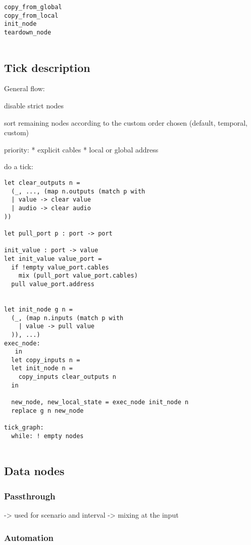 \documentclass[applsci,article,submit,moreauthors,pdftex,10pt,a4paper]{mdpi}
\begin{document}
\begin{lstlisting}
copy_from_global
copy_from_local
init_node
teardown_node


\end{lstlisting} 


\subsection{Tick description}

General flow: 

disable strict nodes

sort remaining nodes according to the custom order chosen (default, temporal, custom)

priority: 
* explicit cables
* local or global address

do a tick: 

\begin{lstlisting}
let clear_outputs n = 
  (_, ..., (map n.outputs (match p with 
  | value -> clear value
  | audio -> clear audio
))

let pull_port p : port -> port 

init_value : port -> value
let init_value value_port = 
  if !empty value_port.cables
    mix (pull_port value_port.cables)
  pull value_port.address


let init_node g n = 
  (_, (map n.inputs (match p with 
    | value -> pull value
  )), ...) 
exec_node: 
   in
  let copy_inputs n = 
  let init_node n = 
    copy_inputs clear_outputs n      
  in 
  
  new_node, new_local_state = exec_node init_node n
  replace g n new_node 
    
tick_graph: 
  while: ! empty nodes 
  
\end{lstlisting}



\subsection{Data nodes}
\subsubsection{Passthrough}
-> used for scenario and interval
-> mixing at the input


\subsubsection{Automation}
\end{document}
